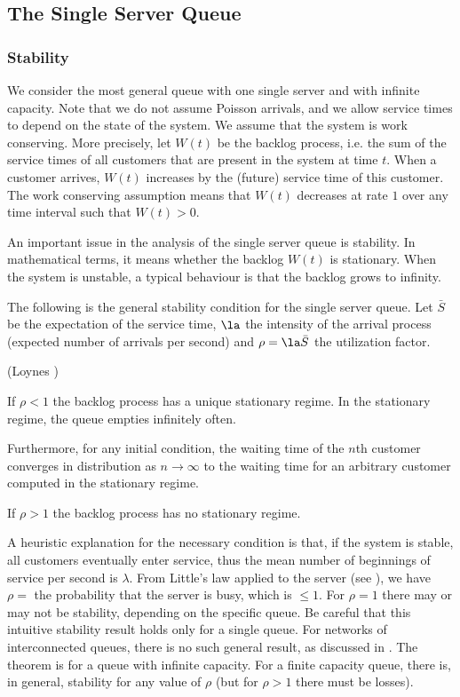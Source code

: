 \subsection{The Single Server Queue}\label{sec-clasq}
\subsubsection{Stability} We consider the most general queue
with one single server and with infinite
capacity. Note that we do not assume Poisson
arrivals, and we allow service times to depend on
the state of the system. We assume that the
system is work conserving. More precisely, let
$W(t)$ be the backlog process, i.e. the sum of
the service times of all customers that are
present in the system at time $t$. When a
customer arrives, $W(t)$ increases by the
(future) service time of this customer. The work
conserving assumption means that $W(t)$ decreases
at rate $1$ over any time interval such that
$W(t)>0$.

An important issue in the analysis of the single
server queue is stability. In mathematical terms,
it means whether the backlog $W(t)$ is
stationary. When the system is unstable, a
typical behaviour is that the backlog grows to
infinity.

The following is the general stability condition
for the single server queue. Let $\bar{S}$ be the
expectation of the service time, $\la$ the
intensity of the arrival process (expected number
of arrivals per second) and $\rho= \la \bar{S}$
the utilization factor.

\begin{shadethm}(Loynes \cite[Thm
2.1.1]{baccelli2003elements})

If $\rho<1$ the backlog process has a unique
stationary regime. In the stationary regime, the
queue empties infinitely often.

Furthermore, for any initial condition, the
waiting time of the $n$th customer converges in
distribution as $n\to \infty$ to the waiting time
for an arbitrary customer computed in the
stationary regime.

If $\rho>1$ the backlog process has no stationary
regime.\label{theo-loynes}
\end{shadethm}
A heuristic explanation for the necessary
condition is that, if the system is stable, all
customers eventually enter service, thus the mean
number of beginnings of service per second is
$\lambda$. From Little's law applied to the
server (see ), we have $\rho=$
the probability that the server is busy, which is
$\leq 1$.
%
For $\rho=1$ there may or may not be stability,
depending on the specific queue.
%
Be careful that this intuitive stability result
holds only for a single queue. For networks of
interconnected queues, there is no such general
result, as discussed in .
%
The theorem is for a queue with infinite
capacity. For a finite capacity queue, there is,
in general, stability for any value of $\rho$
(but for $\rho>1$ there must be losses).


